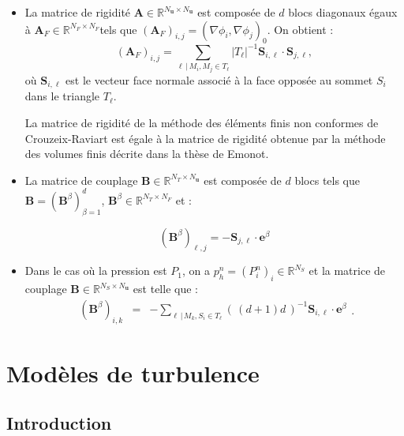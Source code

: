 \begin{itemize}
\item La matrice de rigidit\'e $\mathbf{A}\in\mathbb{R}^{N_{\mathbf{u}}\times N_{\mathbf{u}}}$
est compos\'ee de $d$ blocs diagonaux \'egaux \`a $\mathbf{A}_{F}\in\mathbb{R}^{N_{F}\times N_{F}}$tels
que $\left(\mathbf{A}_{F}\right)_{i,j}=(\nabla\phi_{i},\nabla\phi_{j})_{0}$.
On obtient : 
\[
\left(\mathbf{A}_{F}\right)_{i,j}=\sum_{\ell\,|\,M_{i},M_{j}\in T_{\ell}}|T_{\ell}|^{-1}\mathbf{S}_{i,\ell}\cdot\mathbf{S}_{j,\ell},
\]
o\`u $\mathbf{S}_{i,\ell}$ est le vecteur \og face normale \fg{}
associ\'e \`a la face oppos\'ee au sommet $S_{i}$ dans le triangle $T_{\ell}$.


La matrice de rigidit\'e de la m\'ethode des \'el\'ements finis non conformes
de Crouzeix-Raviart est \'egale \`a la matrice de rigidit\'e obtenue par
la m\'ethode des volumes finis d\'ecrite dans la th\`ese de Emonot.

\item La matrice de couplage $\mathbf{B}\in\mathbb{R}^{N_{T}\times N_{\mathbf{u}}}$
est compos\'ee de $d$ blocs tels que $\mathbf{B}=(\mathbf{B}^{\beta})_{\beta=1}^{d}$,
$\mathbf{B}^{\beta}\in\mathbb{R}^{N_{T}\times N_{F}}$ et :


\[
(\mathbf{B}^{\beta})_{\ell,j}=-\mathbf{S}_{j,\ell}\cdot\mathbf{e}^{\beta}
\]


\item Dans le cas o\`u la pression est $P_{1}$, on a $p_{h}^{n}=(P_{i}^{n})_{i}\in\mathbb{R}^{N_{S}}$
et la matrice de couplage $\mathbf{B}\in\mathbb{R}^{N_{S}\times N_{\mathbf{u}}}$
est telle que : 
\[
\begin{array}{rcl}
(\mathbf{B}^{\beta})_{i,k} & = & -\sum_{\ell\,|\,M_{k},S_{i}\in T_{\ell}}(\,(d+1)d\,)^{-1}\mathbf{S}_{i,\ell}\cdot\mathbf{e}^{\beta}\end{array}.
\]

\end{itemize}

\section{\label{sec:Modeles-de-turbulence}Mod\`eles de turbulence}


\subsection{Introduction}

